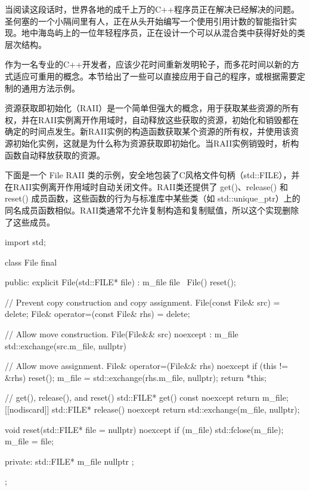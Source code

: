 
当阅读这段话时，世界各地的成千上万的C++程序员正在解决已经解决的问题。圣何塞的一个小隔间里有人，正在从头开始编写一个使用引用计数的智能指针实现。地中海岛屿上的一位年轻程序员，正在设计一个可以从混合类中获得好处的类层次结构。

作为一名专业的C++开发者，应该少花时间重新发明轮子，而多花时间以新的方式适应可重用的概念。本节给出了一些可以直接应用于自己的程序，或根据需要定制的通用方法示例。


资源获取即初始化（RAII）是一个简单但强大的概念，用于获取某些资源的所有权，并在RAII实例离开作用域时，自动释放这些获取的资源，初始化和销毁都在确定的时间点发生。新RAII实例的构造函数获取某个资源的所有权，并使用该资源初始化实例，这就是为什么称为资源获取即初始化。当RAII实例销毁时，析构函数自动释放获取的资源。

下面是一个 File RAII 类的示例，安全地包装了C风格文件句柄（std::FILE），并在RAII实例离开作用域时自动关闭文件。RAII类还提供了 get()、release() 和 reset() 成员函数，这些函数的行为与标准库中某些类（如 std::unique\_ptr）上的同名成员函数相似。RAII类通常不允许复制构造和复制赋值，所以这个实现删除了这些成员。

\begin{cpp}
import std;

class File final
{
    public:
        explicit File(std::FILE* file) : m_file { file } { }
        ~File() { reset(); }

        // Prevent copy construction and copy assignment.
        File(const File& src) = delete;
        File& operator=(const File& rhs) = delete;

        // Allow move construction.
        File(File&& src) noexcept : m_file { std::exchange(src.m_file, nullptr) }
        {
        }

        // Allow move assignment.
        File& operator=(File&& rhs) noexcept
        {
            if (this != &rhs) {
                reset();
                m_file = std::exchange(rhs.m_file, nullptr);
            }
            return *this;
        }

        // get(), release(), and reset()
        std::FILE* get() const noexcept { return m_file; }
        [[nodiscard]] std::FILE* release() noexcept
        {
            return std::exchange(m_file, nullptr);
        }

        void reset(std::FILE* file = nullptr) noexcept
        {
            if (m_file) { std::fclose(m_file); }
            m_file = file;
        }

    private:
        std::FILE* m_file { nullptr };
};
\end{cpp}

